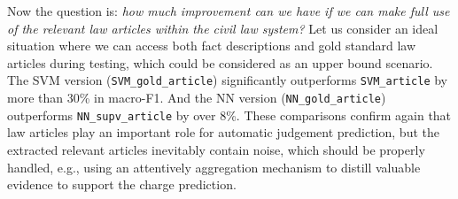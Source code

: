 Now the question is: \textit{how much improvement can we have 
if we can make full use of
the relevant law articles within the civil law system?}
Let us consider an ideal situation where we can access both fact descriptions and gold standard law articles during testing, which could be considered as an upper bound scenario.
The SVM version (\texttt{SVM\_gold\_article}) significantly outperforms %
\texttt{SVM\_article} by more than 30\% in macro-F1.
And the NN version %
(\texttt{NN\_gold\_article}) outperforms 
\texttt{NN\_supv\_article}
by over 8\%.
%
These comparisons confirm again that 
law articles play an important role for automatic judgement prediction, but 
the extracted relevant articles inevitably contain noise, which should be properly 
handled, e.g., using an attentively aggregation mechanism to distill 
valuable evidence to support the charge prediction.





